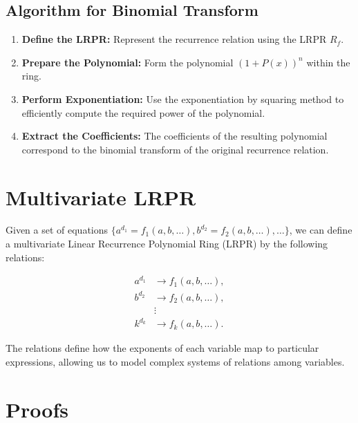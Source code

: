 \documentclass{article}
\theoremstyle{plain}
\begin{document}
\subsection{Algorithm for Binomial Transform}
\begin{enumerate}
    \item \textbf{Define the LRPR:} Represent the recurrence relation using the LRPR \( R_f \).
    \item \textbf{Prepare the Polynomial:} Form the polynomial \( (1 + P(x))^n \) within the ring.
    \item \textbf{Perform Exponentiation:} Use the exponentiation by squaring method to efficiently compute the required power of the polynomial.
    \item \textbf{Extract the Coefficients:} The coefficients of the resulting polynomial correspond to the binomial transform of the original recurrence relation.
\end{enumerate}

\section{Multivariate LRPR}
Given a set of equations \(\{a^{d_1} = f_1(a, b, \ldots), b^{d_2} = f_2(a, b, \ldots), \ldots\}\), we can define a multivariate Linear Recurrence Polynomial Ring (LRPR) by the following relations:

\begin{align*}
a^{d_1} &\rightarrow f_1(a, b, \ldots), \\
b^{d_2} &\rightarrow f_2(a, b, \ldots), \\
&\vdots \\
k^{d_k} &\rightarrow f_k(a, b, \ldots).
\end{align*}

The relations define how the exponents of each variable map to particular expressions, allowing us to model complex systems of relations among variables.

\section{Proofs}
\end{document}
